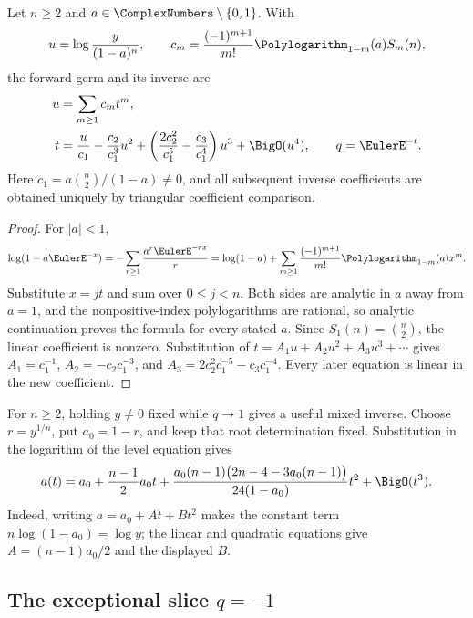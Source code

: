 \begin{theorem}[All-order regular base inverse at \(q=1\)]
\label{fp-unit-base-inverse}
Let \(n\geq2\) and \(a\in\ComplexNumbers\setminus\{0,1\}\).  With
\[
 u=\log\frac{y}{(1-a)^n},\qquad
 c_m=\frac{(-1)^{m+1}}{m!}\Polylogarithm_{1-m}(a)S_m(n),
\]
the forward germ and its inverse are
\begin{align}
 u&=\sum_{m\geq1}c_mt^m,
 \label{fp-unit-base-forward}\\
 t&=\frac{u}{c_1}-\frac{c_2}{c_1^3}u^2
 +\left(\frac{2c_2^2}{c_1^5}-\frac{c_3}{c_1^4}\right)u^3
 +\BigO(u^4),\qquad q=\EulerE^{-t}.
 \label{fp-unit-base-reverse}
\end{align}
Here \(c_1=a\binom n2/(1-a)\ne0\), and all subsequent inverse coefficients
are obtained uniquely by triangular coefficient comparison.
\end{theorem}

\begin{proof}
For \(|a|<1\),
\[
 \log(1-a\EulerE^{-x})
 =-\sum_{r\geq1}\frac{a^r\EulerE^{-rx}}r
 =\log(1-a)+\sum_{m\geq1}
   \frac{(-1)^{m+1}}{m!}\Polylogarithm_{1-m}(a)x^m.
\]
Substitute \(x=jt\) and sum over \(0\leq j<n\).  Both sides are analytic in
\(a\) away from \(a=1\), and the nonpositive-index polylogarithms are rational,
so analytic continuation proves the formula for every stated \(a\).
Since \(S_1(n)=\binom n2\), the linear coefficient is nonzero.  Substitution
of \(t=A_1u+A_2u^2+A_3u^3+\cdots\) gives
\(A_1=c_1^{-1}\), \(A_2=-c_2c_1^{-3}\), and
\(A_3=2c_2^2c_1^{-5}-c_3c_1^{-4}\).  Every later equation is linear in the
new coefficient.
\end{proof}

For \(n\geq2\), holding \(y\ne0\) fixed while \(q\to1\) gives a useful mixed
inverse.  Choose \(r=y^{1/n}\), put \(a_0=1-r\), and keep that root
determination fixed.
Substitution in the logarithm of the level equation gives
\begin{equation}
 a(t)=a_0+\frac{n-1}{2}a_0t+
 \frac{a_0(n-1)\bigl(2n-4-3a_0(n-1)\bigr)}
 {24(1-a_0)}t^2+\BigO(t^3).
 \label{fp-fixed-target-argument}
\end{equation}
Indeed, writing \(a=a_0+At+Bt^2\) makes the constant term
\(n\log(1-a_0)=\log y\); the linear and quadratic equations give
\(A=(n-1)a_0/2\) and the displayed \(B\).

\subsection{\texorpdfstring{The exceptional slice \(q=-1\)}{The exceptional slice q=-1}}
\label{fp-minus-one-section}

